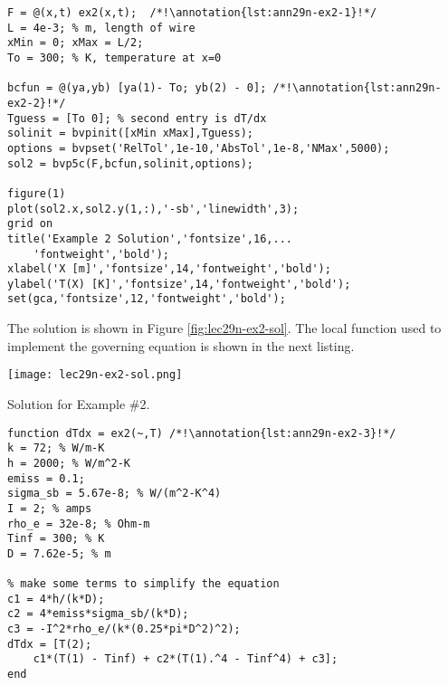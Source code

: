 \begin{lstlisting}[style=myMatlab,name=lec29n-ex2]
F = @(x,t) ex2(x,t);  /*!\annotation{lst:ann29n-ex2-1}!*/
L = 4e-3; % m, length of wire
xMin = 0; xMax = L/2;
To = 300; % K, temperature at x=0

bcfun = @(ya,yb) [ya(1)- To; yb(2) - 0]; /*!\annotation{lst:ann29n-ex2-2}!*/
Tguess = [To 0]; % second entry is dT/dx
solinit = bvpinit([xMin xMax],Tguess);
options = bvpset('RelTol',1e-10,'AbsTol',1e-8,'NMax',5000);
sol2 = bvp5c(F,bcfun,solinit,options);

figure(1)
plot(sol2.x,sol2.y(1,:),'-sb','linewidth',3);
grid on
title('Example 2 Solution','fontsize',16,...
    'fontweight','bold');
xlabel('X [m]','fontsize',14,'fontweight','bold');
ylabel('T(X) [K]','fontsize',14,'fontweight','bold');
set(gca,'fontsize',12,'fontweight','bold');
\end{lstlisting}

\noindent The solution is shown in Figure \ref{fig:lec29n-ex2-sol}.  The local function used to implement the governing equation is shown in the next listing.
\begin{marginfigure}
\texttt{[image: lec29n-ex2-sol.png]}
\caption{Solution for Example \#2.}
\label{fig:lec29n-ex2-sol}
\end{marginfigure}

\begin{lstlisting}[style=myMatlab,name=lec29n-ex2]
%% Local Functions
function dTdx = ex2(~,T) /*!\annotation{lst:ann29n-ex2-3}!*/
k = 72; % W/m-K
h = 2000; % W/m^2-K
emiss = 0.1;
sigma_sb = 5.67e-8; % W/(m^2-K^4)
I = 2; % amps
rho_e = 32e-8; % Ohm-m
Tinf = 300; % K
D = 7.62e-5; % m

% make some terms to simplify the equation
c1 = 4*h/(k*D);
c2 = 4*emiss*sigma_sb/(k*D);
c3 = -I^2*rho_e/(k*(0.25*pi*D^2)^2);
dTdx = [T(2);
    c1*(T(1) - Tinf) + c2*(T(1).^4 - Tinf^4) + c3];
end
\end{lstlisting}


